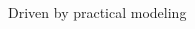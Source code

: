 \documentclass{beamer}
\begin{document}
\begin{frame}{Driven by practical modeling}
\begin{columns}
\begin{column}{0.5\textwidth}
\vspace{10mm}
\end{column}
\begin{column}{0.5\textwidth}
\begin{center}

\end{center}
\end{column}
\end{columns}
\end{frame}
\end{document}
